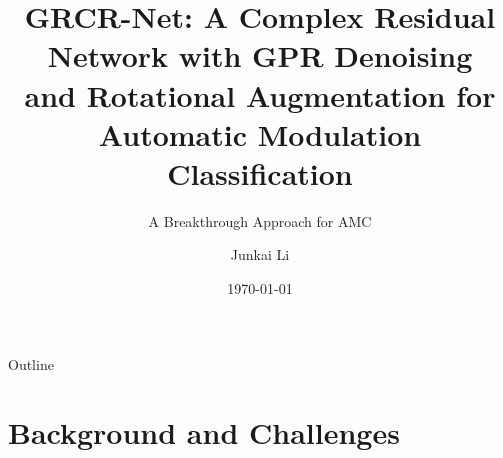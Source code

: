 \documentclass[aspectratio=169]{beamer}
\title[GRCR-Net]{GRCR-Net: A Complex Residual Network with GPR Denoising\\and Rotational Augmentation for Automatic Modulation Classification\\[0.3cm]}
\subtitle{A Breakthrough Approach for AMC}
\author[Junkai Li]{Junkai Li}
\institute[ZJUT]{College of Information Engineering\\Zhejiang University of Technology}
\date{\today}
\begin{document}
\begin{frame}
    \titlepage
\end{frame}

\begin{frame}{Outline}
\tableofcontents
\end{frame}

\section{Background and Challenges}
\end{document}
